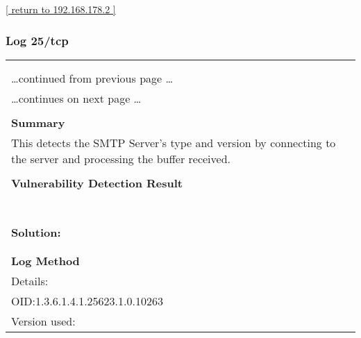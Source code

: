 \documentclass{article}
\begin{document}
\begin{footnotesize}\hyperref[host:192.168.178.2]{[ return to 192.168.178.2 ]}\end{footnotesize}
\subsubsection{Log 25/tcp}
\label{port:192.168.178.2 25/tcp Log}

\begin{longtable}{|p{}|}
\hline
\rowcolor{gvm_log}{\color{white}{Log (CVSS: 0.0) }}\\
\rowcolor{gvm_log}{\color{white}{NVT: SMTP Server type and version}}\\
\hline
\endfirsthead
\hfill\ldots continued from previous page \ldots \\
\hline
\endhead
\hline
\ldots continues on next page \ldots \\
\endfoot
\hline
\endlastfoot
\\
\textbf{Summary}\\
This detects the SMTP Server's type and version by connecting to
  the server and processing the buffer received.\\

        \hline
        \\
\textbf{Vulnerability Detection Result}\\
\rowcolor{white}{\verb=Remote SMTP server banner:=}\\
\rowcolor{white}{\verb=220 localhost.fritz.box ESMTP Postfix (Debian/GNU)=}\\
\rowcolor{white}{\verb=The remote SMTP server is announcing the following available ESMTP commands (EHL=}\\
\rowcolor{white}{$\hookrightarrow$\verb=O response) via an unencrypted connection:=}\\
\rowcolor{white}{\verb=8BITMIME, CHUNKING, DSN, ENHANCEDSTATUSCODES, ETRN, PIPELINING, SIZE 10240000, S=}\\
\rowcolor{white}{$\hookrightarrow$\verb=MTPUTF8, STARTTLS, VRFY=}\\

          \hline
          \\
\textbf{Solution:}\\
\\


        \hline
        \\
\textbf{Log Method}\\
Details:
\rowcolor{white}{\verb=SMTP Server type and version=}\\
OID:1.3.6.1.4.1.25623.1.0.10263\\
Version used:
\rowcolor{white}{\verb=2022-02-01T10:00:18Z=}\\
\end{longtable}
\end{document}
